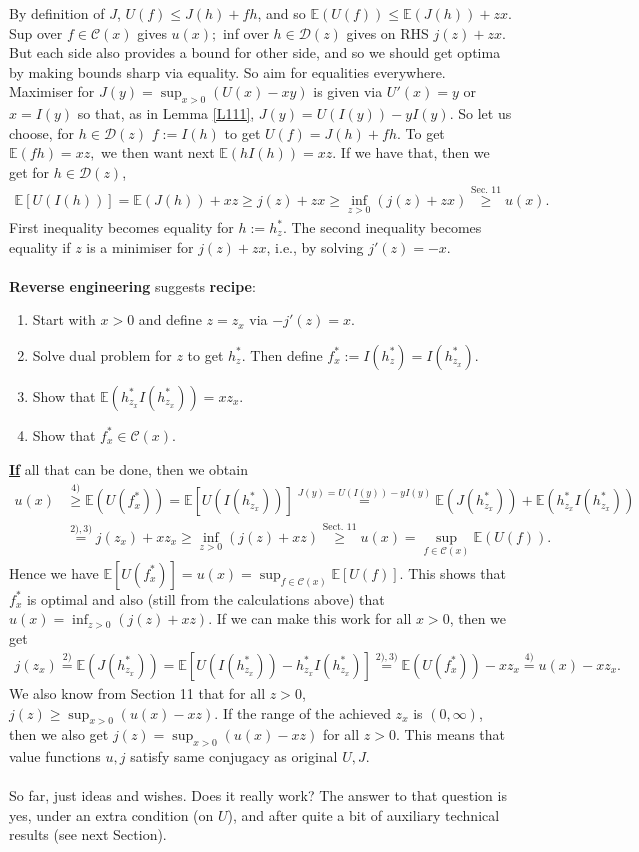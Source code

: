 \documentclass[12pt,a4paper, twoside]{article}
\theoremstyle{definition}
\newcommand{\EE}{\mathbb{E}} %
\begin{document}
By definition of $J$, $U(f) \leq J(h) + fh$, and so $\EE(U(f)) \leq \EE(J(h)) + zx$. Sup over $f \in \mathcal{C}(x)$ gives $u(x);$ inf over $h \in \mathcal{D}(z)$ gives on RHS $j(z) + zx$. But each side also provides a bound for other side, and so we should get optima by making bounds sharp via equality. 
\newpage
So aim for equalities everywhere. Maximiser for $J(y)= \sup_{x >0} (U(x)-xy)$ is given via $U'(x)=y$ or $x=I(y)$ so that, as in Lemma \ref{L111}, $J(y)=U(I(y))-yI(y)$. So let us choose, for $h  \in \mathcal{D}(z)$ $f:= I(h)$ to get $U(f)=J(h)+fh$. To get $\EE(fh)=xz,$ we then want next $\EE(hI(h))=xz$. If we have that, then we get for $h \in \mathcal{D}(z)$, 
\begin{align*}
\EE[U(I(h))]= \EE(J(h)) + xz \geq j(z) + zx \geq \inf_{z >0} (j(z)+zx) \overset{\text{Sec. 11}}\geq u(x).
\end{align*}
First inequality becomes equality for $h:= h_z^*$. The second inequality becomes equality if $z$ is a minimiser for $j(z)+zx$, i.e., by solving $j'(z)=-x$. 
\\\\
\textbf{Reverse engineering} suggests \textbf{recipe}:
\begin{enumerate}
\item Start with $x>0$ and define $z=z_x$ via $-j'(z)=x.$
\item Solve dual problem for $z$ to get $h_z^*$. Then define $f_x^* := I(h_z^*)=I(h_{z_x}^*)$. 
\item Show that  $\EE(h_{z_x}^*I(h_{z_x}^*))=xz_x$.
\item Show that $f_x^* \in \mathcal{C}(x)$.
\end{enumerate}
\underline{\textbf{If}} all that can be done, then we obtain 
\begin{align*}
u(x) &\overset{4)}\geq \EE(U(f_x^*))= \EE[U(I(h_{z_x}^*))] \overset{J(y)=U(I(y))-yI(y)}= \EE(J(h_{z_x}^*)) + \EE(h_{z_x}^*I(h_{z_x}^*)) \\
& \overset{2),3)}= j(z_x) + xz_x \geq \inf_{z >0} (j(z)+xz) \overset{\text{Sect. 11}}\geq u(x) = \sup_{f \in \mathcal{C}(x)} \EE(U(f)).
\end{align*}
Hence we have $\EE[U(f_x^*)]=u(x)=\sup_{f \in \mathcal{C}(x)} \EE[U(f)]$. This shows that $f_x^*$ is optimal and also (still from the calculations above) that $u(x)= \inf_{z >0} (j(z) + xz)$. If we can make this work for all $x>0$, then we get
\begin{align*}
j(z_x) \overset{2)}= \EE(J(h_{z_x}^*))= \EE[U(I(h_{z_x}^*))-h_{z_x}^*I(h_{z_x}^*)] \overset{2),3)}= \EE(U(f_x^*))-xz_x \overset{4)}=u(x)-xz_x.
\end{align*}
We also know from Section 11 that for all $z>0$, $j(z) \geq \sup_{x >0} (u(x)-xz).$ If the range of the achieved $z_x$ is $(0, \infty)$, then we also get $j(z)= \sup_{x >0} (u(x)-xz)$ for all $z>0$. This means that value functions $u,j$ satisfy same conjugacy as original $U,J$. 
\\\\
So far, just ideas and wishes. Does it really work? The answer to that question is yes, under an extra condition (on $U$), and after quite a bit of auxiliary technical results (see next Section). 
\newpage
\end{document}
